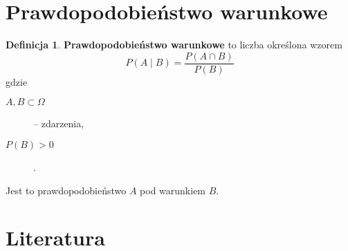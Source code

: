\documentclass[11pt, leqno]{scrartcl}
\theoremstyle{definition}
\newtheorem{definition}{Definicja}[section]
\begin{document}
    \section{Prawdopodobieństwo warunkowe}
    \begin{definition}
        \textbf{Prawdopodobieństwo warunkowe} to liczba określona
        wzorem
        \[
            P(A \mid B)=\frac{P(A \cap B)}{P(B)}
        \]
        gdzie
        \begin{description}
            \item[$A,B \subset \Omega$] -- zdarzenia,
            \item[$P(B)>0$].
        \end{description}
        Jest to prawdopodobieństwo $A$ pod warunkiem $B$.
    \end{definition}

    \section{Literatura}
\end{document}
